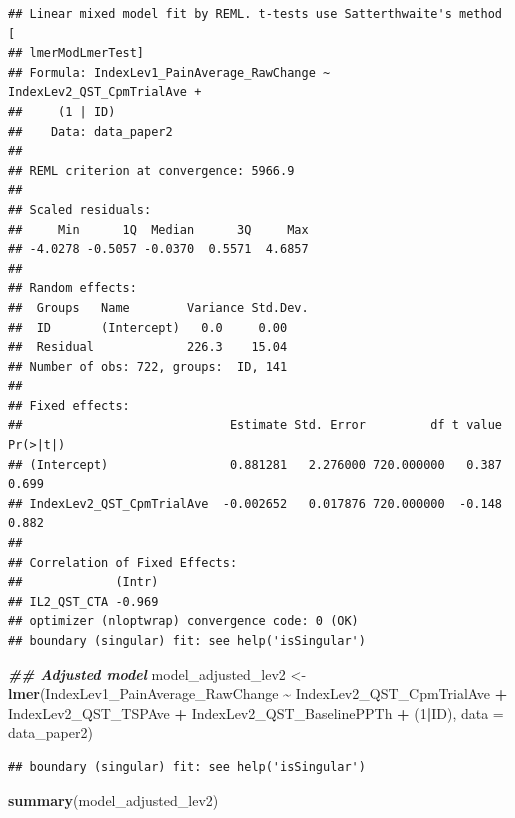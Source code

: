 \documentclass[
  12pt,
]{article}
\newenvironment{Shaded}{\begin{snugshade}}{\end{snugshade}}
\newcommand{\AttributeTok}[1]{\textcolor[rgb]{0.13,0.29,0.53}{#1}}
\newcommand{\DecValTok}[1]{\textcolor[rgb]{0.00,0.00,0.81}{#1}}
\newcommand{\DocumentationTok}[1]{\textcolor[rgb]{0.56,0.35,0.01}{\textbf{\textit{#1}}}}
\newcommand{\FunctionTok}[1]{\textcolor[rgb]{0.13,0.29,0.53}{\textbf{#1}}}
\newcommand{\NormalTok}[1]{#1}
\newcommand{\OtherTok}[1]{\textcolor[rgb]{0.56,0.35,0.01}{#1}}
\newcommand{\SpecialCharTok}[1]{\textcolor[rgb]{0.81,0.36,0.00}{\textbf{#1}}}
\begin{document}
\begin{verbatim}
## Linear mixed model fit by REML. t-tests use Satterthwaite's method [
## lmerModLmerTest]
## Formula: IndexLev1_PainAverage_RawChange ~ IndexLev2_QST_CpmTrialAve +  
##     (1 | ID)
##    Data: data_paper2
## 
## REML criterion at convergence: 5966.9
## 
## Scaled residuals: 
##     Min      1Q  Median      3Q     Max 
## -4.0278 -0.5057 -0.0370  0.5571  4.6857 
## 
## Random effects:
##  Groups   Name        Variance Std.Dev.
##  ID       (Intercept)   0.0     0.00   
##  Residual             226.3    15.04   
## Number of obs: 722, groups:  ID, 141
## 
## Fixed effects:
##                             Estimate Std. Error         df t value Pr(>|t|)
## (Intercept)                 0.881281   2.276000 720.000000   0.387    0.699
## IndexLev2_QST_CpmTrialAve  -0.002652   0.017876 720.000000  -0.148    0.882
## 
## Correlation of Fixed Effects:
##             (Intr)
## IL2_QST_CTA -0.969
## optimizer (nloptwrap) convergence code: 0 (OK)
## boundary (singular) fit: see help('isSingular')
\end{verbatim}

\begin{Shaded}
\begin{Highlighting}[]
\DocumentationTok{\#\# Adjusted model}
\NormalTok{model\_adjusted\_lev2 }\OtherTok{\textless{}{-}} \FunctionTok{lmer}\NormalTok{(IndexLev1\_PainAverage\_RawChange }\SpecialCharTok{\textasciitilde{}}\NormalTok{ IndexLev2\_QST\_CpmTrialAve }\SpecialCharTok{+}\NormalTok{ IndexLev2\_QST\_TSPAve }\SpecialCharTok{+}\NormalTok{ IndexLev2\_QST\_BaselinePPTh }\SpecialCharTok{+}\NormalTok{ (}\DecValTok{1}\SpecialCharTok{|}\NormalTok{ID), }\AttributeTok{data =}\NormalTok{ data\_paper2)}
\end{Highlighting}
\end{Shaded}

\begin{verbatim}
## boundary (singular) fit: see help('isSingular')
\end{verbatim}

\begin{Shaded}
\begin{Highlighting}[]
\FunctionTok{summary}\NormalTok{(model\_adjusted\_lev2)}
\end{Highlighting}
\end{Shaded}
\end{document}
